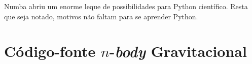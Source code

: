 \documentclass[
	12pt,				%
	a4paper,			%
	english,			%
	openright,				%
	brazil,				%
	oneside]{abntex2}
\begin{document}
	Numba abriu um enorme leque de possibilidades para Python científico. Resta que seja notado, motivos não faltam para se aprender Python.


\postextual


%


%

%
%


\printindex

\appendix
\chapter{Código-fonte $n$-\textit{body} Gravitacional}
\inputminted[fontsize=\footnotesize]{python}{nbody_gravitacional.py}
\end{document}
